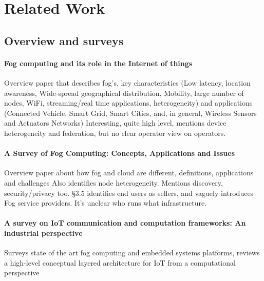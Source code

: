 \section{Related Work}



\subsection{Overview and surveys}

\paragraph{Fog computing and its role in the Internet of things} \cite{Bonomi:2012:FCR:2342509.2342513}
Overview paper that describes fog's, key characteristics (Low latency, location awareness, Wide-spread geographical distribution, Mobility, large number of nodes, WiFi, streaming/real time applications, heterogeneity) and applications (Connected Vehicle, Smart Grid, Smart Cities, and, in general, Wireless Sensors and Actuators Networks)
Interesting, quite high level, mentions device heterogeneity and federation,
but no clear operator view on operators.


\paragraph{A Survey of Fog Computing: Concepts, Applications and Issues} \cite{Yi:2015:SFC:2757384.2757397}
Overview paper about how fog and cloud are different, definitions, applications and challenges
Also identifies node heterogeneity. Mentions discovery, security/privacy too. §3.5 identifies
end users as sellers, and vaguely introduces Fog service providers. It's unclear who runs what
infrastructure. 

\paragraph{A survey on IoT communication and computation frameworks: An industrial perspective}\cite{7868354}
Surveys state of the art fog computing and embedded systems platforms, reviews a high-level conceptual layered architecture for IoT from a computational perspective

